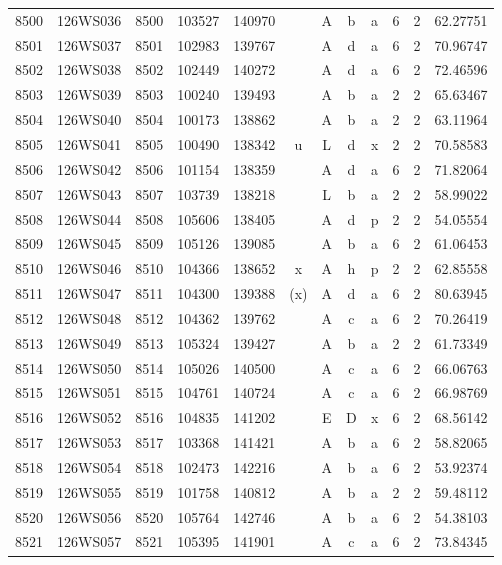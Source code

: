 \begin{tabular}{|*{12}{c|}}
8500 & 126WS036 & 8500 & 103527 & 140970 &  & A & b & a & 6 & 2 & 62.27751 \\ 
8501 & 126WS037 & 8501 & 102983 & 139767 &  & A & d & a & 6 & 2 & 70.96747 \\ 
8502 & 126WS038 & 8502 & 102449 & 140272 &  & A & d & a & 6 & 2 & 72.46596 \\ 
8503 & 126WS039 & 8503 & 100240 & 139493 &  & A & b & a & 2 & 2 & 65.63467 \\ 
8504 & 126WS040 & 8504 & 100173 & 138862 &  & A & b & a & 2 & 2 & 63.11964 \\ 
8505 & 126WS041 & 8505 & 100490 & 138342 & u & L & d & x & 2 & 2 & 70.58583 \\ 
8506 & 126WS042 & 8506 & 101154 & 138359 &  & A & d & a & 6 & 2 & 71.82064 \\ 
8507 & 126WS043 & 8507 & 103739 & 138218 &  & L & b & a & 2 & 2 & 58.99022 \\ 
8508 & 126WS044 & 8508 & 105606 & 138405 &  & A & d & p & 2 & 2 & 54.05554 \\ 
8509 & 126WS045 & 8509 & 105126 & 139085 &  & A & b & a & 6 & 2 & 61.06453 \\ 
8510 & 126WS046 & 8510 & 104366 & 138652 & x & A & h & p & 2 & 2 & 62.85558 \\ 
8511 & 126WS047 & 8511 & 104300 & 139388 & (x) & A & d & a & 6 & 2 & 80.63945 \\ 
8512 & 126WS048 & 8512 & 104362 & 139762 &  & A & c & a & 6 & 2 & 70.26419 \\ 
8513 & 126WS049 & 8513 & 105324 & 139427 &  & A & b & a & 2 & 2 & 61.73349 \\ 
8514 & 126WS050 & 8514 & 105026 & 140500 &  & A & c & a & 6 & 2 & 66.06763 \\ 
8515 & 126WS051 & 8515 & 104761 & 140724 &  & A & c & a & 6 & 2 & 66.98769 \\ 
8516 & 126WS052 & 8516 & 104835 & 141202 &  & E & D & x & 6 & 2 & 68.56142 \\ 
8517 & 126WS053 & 8517 & 103368 & 141421 &  & A & b & a & 6 & 2 & 58.82065 \\ 
8518 & 126WS054 & 8518 & 102473 & 142216 &  & A & b & a & 6 & 2 & 53.92374 \\ 
8519 & 126WS055 & 8519 & 101758 & 140812 &  & A & b & a & 2 & 2 & 59.48112 \\ 
8520 & 126WS056 & 8520 & 105764 & 142746 &  & A & b & a & 6 & 2 & 54.38103 \\ 
8521 & 126WS057 & 8521 & 105395 & 141901 &  & A & c & a & 6 & 2 & 73.84345 \\ 

\end{tabular}
